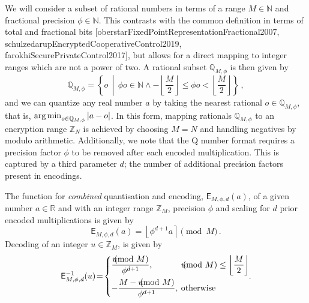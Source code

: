 We will consider a subset of rational numbers in terms of a range $M \in \mathbb{N}$ and fractional precision $\phi \in \mathbb{N}$. This contrasts with the common definition in terms of total and fractional bits [oberstarFixedPointRepresentationFractional2007, schulzedarupEncryptedCooperativeControl2019, farokhiSecurePrivateControl2017], but allows for a direct mapping to integer ranges which are not a power of two. A rational subset $\mathbb{Q}_{M,\phi}$ is then given by
\begin{equation}
    \mathbb{Q}_{M,\phi} = \left\{o \,\middle|\, \phi o \in \mathbb{N} \wedge -\left\lfloor\frac{M}{2}\right\rfloor \leq \phi o < \left\lfloor\frac{M}{2}\right\rfloor \right\}\,,
\end{equation}
and we can quantize any real number $a$ by taking the nearest rational $o \in \mathbb{Q}_{M,\phi}$, that is, $\operatorname*{arg\,min}_{o\in\mathbb{Q}_{M,\phi}} |a-o|$. In this form, mapping rationals $\mathbb{Q}_{M,\phi}$ to an encryption range $\mathbb{Z}_N$ is achieved by choosing $M=N$ and handling negatives by modulo arithmetic. Additionally, we note that the Q number format requires a precision factor $\phi$ to be removed after each encoded multiplication. This is captured by a third parameter $d$; the number of additional precision factors present in encodings.

The function for \textit{combined} quantisation and encoding, $\mathsf{E}_{M,\phi,d}(a)$, of a given number $a \in \mathbb{R}$ and with an integer range $\mathbb{Z}_M$, precision $\phi$ and scaling for $d$ prior encoded multiplications is given by
\begin{equation}
    \mathsf{E}_{M,\phi,d}(a) = \left\lfloor \phi^{d+1} a \right\rceil \pmod{M}\,. \label{eqn:encode}
\end{equation}
Decoding of an integer $u \in \mathbb{Z}_M$, is given by
\begin{equation}
    \mathsf{E}^{-1}_{M,\phi,d}(u) \!=\! 
    \begin{dcases}
        \frac{u\hspace{-8pt}\pmod{M}}{\phi^{d+1}}, &\hspace{-6pt}u\hspace{-8pt}\pmod{M} \leq \left\lfloor\frac{M}{2}\right\rfloor \\
        -\frac{M - u\hspace{-8pt}\pmod{M}}{\phi^{d+1}}, &\hspace{-6pt}\text{otherwise} \\
    \end{dcases}\!\!.\label{eqn:decode}
\end{equation}

